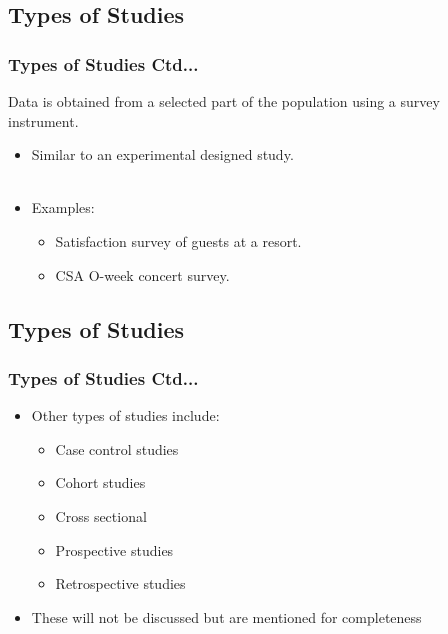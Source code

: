 \documentclass[xcolor=svgnames, compress]{beamer}
\begin{document}
\subsection*{Types of Studies}

\begin{frame}
\frametitle{Types of Studies Ctd...}

\vspace{-0.5cm}

\begin{definition}
Data is obtained from a selected part of the population using a survey instrument.
\end{definition}

\vspace{0.25cm}

\begin{itemize}
\item	Similar to an experimental designed study.\\
\hfill\\
\item	Examples:
	\begin{itemize}\justifying
	\item	Satisfaction survey of guests at a resort.
	\item	CSA O-week concert survey.
	\end{itemize}
\end{itemize}

\end{frame}




\subsection*{Types of Studies}

\begin{frame}
\frametitle{Types of Studies Ctd...}

\vspace{-0.5cm}

\begin{itemize}
\item	Other types of studies include:
	\begin{itemize}\justifying
	\item	Case control studies
	\item	Cohort studies
	\item	Cross sectional
	\item	Prospective studies
	\item	Retrospective studies
	\end{itemize}
\vspace{0.25cm}
\item	These will not be discussed but are mentioned for completeness
\end{itemize}

\end{frame}
\end{document}
